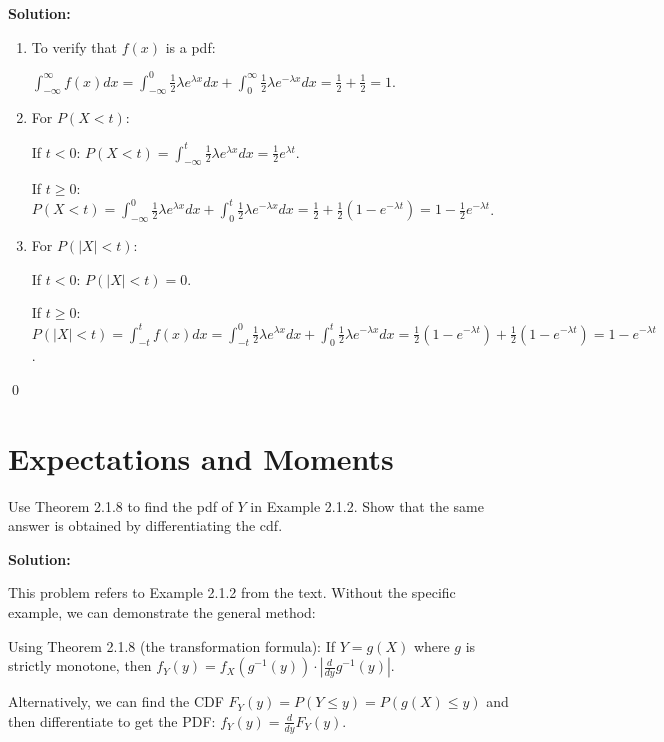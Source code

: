 \noindent\textbf{Solution:}
\begin{enumerate}[label=(\alph*)]
    \item To verify that $f(x)$ is a pdf:
    
    $\int_{-\infty}^{\infty} f(x)dx = \int_{-\infty}^0 \frac{1}{2}\lambda e^{\lambda x}dx + \int_0^{\infty} \frac{1}{2}\lambda e^{-\lambda x}dx = \frac{1}{2} + \frac{1}{2} = 1$.
    
    \item For $P(X < t)$:
    
    If $t < 0$: $P(X < t) = \int_{-\infty}^t \frac{1}{2}\lambda e^{\lambda x}dx = \frac{1}{2}e^{\lambda t}$.
    
    If $t \geq 0$: $P(X < t) = \int_{-\infty}^0 \frac{1}{2}\lambda e^{\lambda x}dx + \int_0^t \frac{1}{2}\lambda e^{-\lambda x}dx = \frac{1}{2} + \frac{1}{2}(1-e^{-\lambda t}) = 1 - \frac{1}{2}e^{-\lambda t}$.
    
    \item For $P(|X| < t)$:
    
    If $t < 0$: $P(|X| < t) = 0$.
    
    If $t \geq 0$: $P(|X| < t) = \int_{-t}^t f(x)dx = \int_{-t}^0 \frac{1}{2}\lambda e^{\lambda x}dx + \int_0^t \frac{1}{2}\lambda e^{-\lambda x}dx = \frac{1}{2}(1-e^{-\lambda t}) + \frac{1}{2}(1-e^{-\lambda t}) = 1 - e^{-\lambda t}$.
\end{enumerate}


\qed
\section{Expectations and Moments}

\begin{problembox}
Use Theorem 2.1.8 to find the pdf of $Y$ in Example 2.1.2. Show that the same answer is obtained by differentiating the cdf.
\end{problembox}

\noindent\textbf{Solution:}

This problem refers to Example 2.1.2 from the text. Without the specific example, we can demonstrate the general method:

Using Theorem 2.1.8 (the transformation formula): If $Y = g(X)$ where $g$ is strictly monotone, then $f_Y(y) = f_X(g^{-1}(y)) \cdot |\frac{d}{dy}g^{-1}(y)|$.

Alternatively, we can find the CDF $F_Y(y) = P(Y \leq y) = P(g(X) \leq y)$ and then differentiate to get the PDF: $f_Y(y) = \frac{d}{dy}F_Y(y)$.

